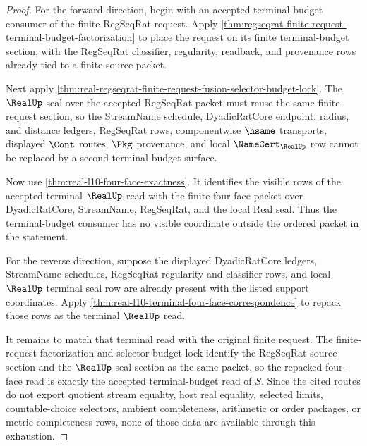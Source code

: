 \begin{proof}
For the forward direction, begin with an accepted terminal-budget consumer of the finite RegSeqRat request. Apply \autoref{thm:regseqrat-finite-request-terminal-budget-factorization} to place the request on its finite terminal-budget section, with the RegSeqRat classifier, regularity, readback, and provenance rows already tied to a finite source packet.

Next apply \autoref{thm:real-regseqrat-finite-request-fusion-selector-budget-lock}. The $\RealUp$ seal over the accepted RegSeqRat packet must reuse the same finite request section, so the StreamName schedule, DyadicRatCore endpoint, radius, and distance ledgers, RegSeqRat rows, componentwise $\hsame$ transports, displayed $\Cont$ routes, $\Pkg$ provenance, and local $\NameCert_{\RealUp}$ row cannot be replaced by a second terminal-budget surface.

Now use \autoref{thm:real-l10-four-face-exactness}. It identifies the visible rows of the accepted terminal $\RealUp$ read with the finite four-face packet over DyadicRatCore, StreamName, RegSeqRat, and the local Real seal. Thus the terminal-budget consumer has no visible coordinate outside the ordered packet in the statement.

For the reverse direction, suppose the displayed DyadicRatCore ledgers, StreamName schedules, RegSeqRat regularity and classifier rows, and local $\RealUp$ terminal seal row are already present with the listed support coordinates. Apply \autoref{thm:real-l10-terminal-four-face-correspondence} to repack those rows as the terminal $\RealUp$ read.

It remains to match that terminal read with the original finite request. The finite-request factorization and selector-budget lock identify the RegSeqRat source section and the $\RealUp$ seal section as the same packet, so the repacked four-face read is exactly the accepted terminal-budget read of $S$. Since the cited routes do not export quotient stream equality, host real equality, selected limits, countable-choice selectors, ambient completeness, arithmetic or order packages, or metric-completeness rows, none of those data are available through this exhaustion.
\end{proof}

